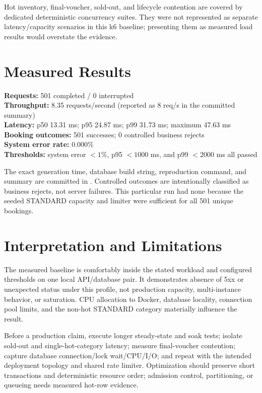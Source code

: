 Hot inventory, final-voucher, sold-out, and lifecycle contention are covered by
dedicated deterministic concurrency suites. They were not represented as
separate latency/capacity scenarios in this k6 baseline; presenting them as
measured load results would overstate the evidence.

\section{Measured Results}
\begin{resultbox}
\textbf{Requests:} 501 completed / 0 interrupted\\
\textbf{Throughput:} 8.35 requests/second (reported as 8 req/s in the committed summary)\\
\textbf{Latency:} p50 13.31 ms; p95 24.87 ms; p99 31.73 ms; maximum 47.63 ms\\
\textbf{Booking outcomes:} 501 successes; 0 controlled business rejects\\
\textbf{System error rate:} 0.000\%\\
\textbf{Thresholds:} system error $<1\%$, p95 $<1000$ ms, and p99 $<2000$ ms all passed
\end{resultbox}

The exact generation time, database build string, reproduction command, and
summary are committed in . Controlled
 outcomes are intentionally classified as business rejects,
not server failures. This particular run had none because the seeded STANDARD
capacity and limiter were sufficient for all 501 unique bookings.

\section{Interpretation and Limitations}
The measured baseline is comfortably inside the stated workload and configured
thresholds on one local API/database pair. It demonstrates absence of 5xx or
unexpected status under this profile, not production capacity, multi-instance
behavior, or saturation. CPU allocation to Docker, database locality, connection
pool limits, and the non-hot STANDARD category materially influence the result.

Before a production claim, execute longer steady-state and soak tests; isolate
sold-out and single-hot-category latency; measure final-voucher contention;
capture database connection/lock wait/CPU/I/O; and repeat with the intended
deployment topology and shared rate limiter. Optimization should preserve short
transactions and deterministic resource order; admission control, partitioning,
or queueing needs measured hot-row evidence.
